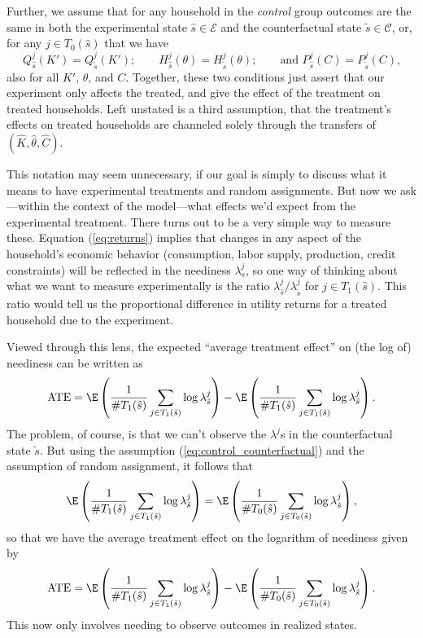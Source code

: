 \documentclass[11pt]{article}
\newcommand{\Eq}[1]{(\ref{eq:#1})}
\begin{document}
Further, we assume that for any household in the \emph{control} group
outcomes are the same in both the experimental state $\hat
s\in\mathcal{E}$ and the counterfactual state $\tilde
s\in\mathcal{C}$, or, for any $j\in T_0(\hat s)$ that we have
\begin{equation}
\label{eq:control_counterfactual}
   Q^j_{\hat s}(K') =    Q^j_{\tilde s}(K'); \qquad
   H^j_{\hat s}(\theta) = H^j_{\tilde s}(\theta);\qquad
   \text{and $P^j_{\hat s}(C) = P^j_{\tilde s}(C)$,}
\end{equation}
also for all $K'$, $\theta$, and $C$.  Together, these two conditions
just assert that our experiment only affects the treated, and give the
effect of the treatment on treated households.  Left unstated is a
third assumption, that the treatment's effects on treated households
are channeled solely through the transfers of $(\hat K,\hat\theta,\hat
C)$.



This notation may seem unnecessary, if our goal is simply to discuss
what it means to have experimental treatments and random assignments.
But now we ask---within the context of the model---what effects we'd
expect from the experimental treatment.  There turns out to be a very
simple way to measure these.  Equation \Eq{returns} implies that
changes in any aspect of the household's economic behavior
(consumption, labor supply, production, credit constraints) will be
reflected in the neediness $\lambda^j_s$, so one way of thinking about
what we want to measure experimentally is the ratio $\lambda^j_{\hat
s}/\lambda^j_{\tilde s}$ for $j\in T_1(\hat s)$.  This ratio would
tell us the proportional difference in utility returns for a treated
household due to the experiment.

Viewed through this lens, the expected ``average treatment effect''
on (the log of) neediness can be written as
\[
   \mbox{ATE}=\E\left(\frac{1}{\#T_1(\hat s)}\sum_{j\in T_1(\hat s)}\log\lambda^j_{\hat s}\right) - \E\left(\frac{1}{\#T_1(\hat s)}\sum_{j\in T_1(\hat s)}\log\lambda^j_{\tilde s} \right).
\]
The problem, of course, is that we can't observe the \(\lambda^j\)s in
the counterfactual state $\tilde s$.  But using the assumption
\Eq{control_counterfactual} and the assumption of random assignment,
it follows that 
\[
   \E\left(\frac{1}{\#T_1(\hat s)}\sum_{j\in T_1(\hat
       s)}\log\lambda^j_{\tilde s} \right)=\E\left(\frac{1}{\#T_0(\hat
       s)}\sum_{j\in T_0(\hat s)}\log\lambda^j_{\hat s} \right), 
\]
so that we have the average treatment effect on the logarithm of
neediness given by 
\begin{equation}
\label{eq:ate}
    \mbox{ATE}=\E\left(\frac{1}{\#T_1(\hat s)}\sum_{j\in T_1(\hat s)}\log\lambda^j_{\hat s}\right) - \E\left(\frac{1}{\#T_0(\hat s)}\sum_{j\in T_0(\hat s)}\log\lambda^j_{\hat s} \right).
\end{equation}
This now only involves needing to observe outcomes in realized states.
\end{document}
